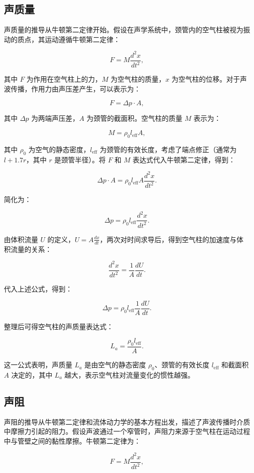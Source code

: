 \subsection{声质量}

声质量的推导从牛顿第二定律开始。假设在声学系统中，颈管内的空气柱被视为振动的质点，其运动遵循牛顿第二定律：

\[
F = M \frac{d^2 x}{dt^2},
\]

其中 \( F \) 为作用在空气柱上的力，\( M \) 为空气柱的质量，\( x \) 为空气柱的位移。对于声波传播，作用力由声压差产生，可以表示为：

\[
F = \Delta p \cdot A,
\]

其中 \( \Delta p \) 为两端声压差，\( A \) 为颈管的截面积。空气柱的质量 \( M \) 表示为：

\[
M = \rho_0 l_{\text{eff}} A,
\]

其中 \( \rho_0 \) 为空气的静态密度，\( l_{\text{eff}} \) 为颈管的有效长度，考虑了端点修正（通常为 \( l + 1.7r \)，其中 \( r \) 是颈管半径）。将 \( F \) 和 \( M \) 表达式代入牛顿第二定律，得到：

\[
\Delta p \cdot A = \rho_0 l_{\text{eff}} A \frac{d^2 x}{dt^2}.
\]

简化为：

\[
\Delta p = \rho_0 l_{\text{eff}} \frac{d^2 x}{dt^2}.
\]

由体积流量 \( U \) 的定义，\( U = A \frac{dx}{dt} \)，两次对时间求导后，得到空气柱的加速度与体积流量的关系：

\[
\frac{d^2 x}{dt^2} = \frac{1}{A} \frac{dU}{dt}.
\]

代入上述公式，得到：

\[
\Delta p = \rho_0 l_{\text{eff}} \frac{1}{A} \frac{dU}{dt}.
\]

整理后可得空气柱的声质量表达式：

\[
L_a = \frac{\rho_0 l_{\text{eff}}}{A}.
\]

这一公式表明，声质量 \( L_a \) 是由空气的静态密度 \(\rho_0\)、颈管的有效长度 \(l_{\text{eff}}\) 和截面积 \(A\) 决定的，其中 \( L_a \) 越大，表示空气柱对流量变化的惯性越强。

\subsection{声阻}
声阻的推导从牛顿第二定律和流体动力学的基本方程出发，描述了声波传播时介质中摩擦力引起的阻力。假设声波通过一个窄管时，声阻力来源于空气柱在运动过程中与管壁之间的黏性摩擦。牛顿第二定律为：

\[
F = M \frac{d^2 x}{dt^2},
\]

